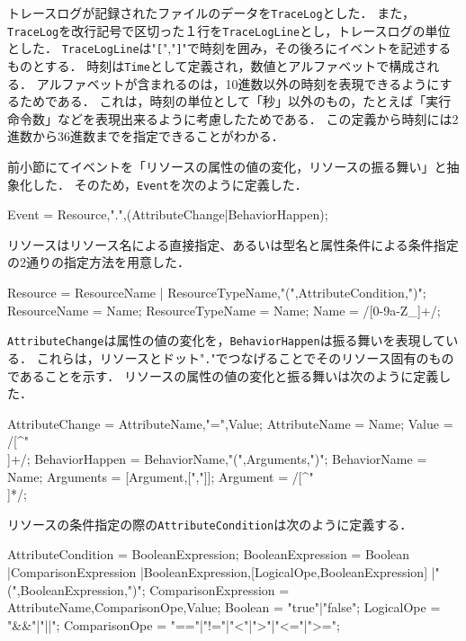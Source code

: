 トレースログが記録されたファイルのデータを\verb|TraceLog|とした．
また，\verb|TraceLog|を改行記号で区切った１行を\verb|TraceLogLine|とし，トレースログの単位とした．
\verb|TraceLogLine|は"\verb|[|","\verb|]|"で時刻を囲み，その後ろにイベントを記述するものとする．
時刻は\verb|Time|として定義され，数値とアルファベットで構成される．
アルファベットが含まれるのは，10進数以外の時刻を表現できるようにするためである．
これは，時刻の単位として「秒」以外のもの，たとえば「実行命令数」などを表現出来るように考慮したためである．
この定義から時刻には2進数から36進数までを指定できることがわかる．

前小節にてイベントを「リソースの属性の値の変化，リソースの振る舞い」と抽象化した．
そのため，\verb|Event|を次のように定義した．

\begin{EBNF}
Event = Resource,".",(AttributeChange|BehaviorHappen);
\end{EBNF}

リソースはリソース名による直接指定、あるいは型名と属性条件による条件指定の2通りの指定方法を用意した．

\begin{EBNF}
Resource = ResourceName
         | ResourceTypeName,"(",AttributeCondition,")";
ResourceName = Name;
ResourceTypeName = Name;
Name = /[0-9a-Z_]+/;
\end{EBNF}

\verb|AttributeChange|は属性の値の変化を，\verb|BehaviorHappen|は振る舞いを表現している．
これらは，リソースとドット"\verb|.|"でつなげることでそのリソース固有のものであることを示す．
リソースの属性の値の変化と振る舞いは次のように定義した．

\begin{EBNF}
AttributeChange = AttributeName,"=",Value;
AttributeName = Name;
Value = /[^"\\]+/;
BehaviorHappen =  BehaviorName,"(",Arguments,")";
BehaviorName = Name;
Arguments = [{Argument,[","]}];
Argument = /[^"\\]*/;
\end{EBNF}

リソースの条件指定の際の\verb|AttributeCondition|は次のように定義する．

\begin{EBNF}
AttributeCondition = BooleanExpression;
BooleanExpression = Boolean
   |ComparisonExpression
   |BooleanExpression,[{LogicalOpe,BooleanExpression}]
   |"(",BooleanExpression,")";
ComparisonExpression = AttributeName,ComparisonOpe,Value;
Boolean = "true"|"false";
LogicalOpe = "&&"|"||";
ComparisonOpe = "=="|"!="|"<"|">"|"<="|">=";
\end{EBNF}

